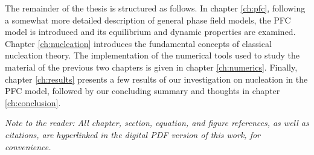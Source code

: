 The remainder of the thesis is structured as follows. In chapter \ref{ch:pfc}, following a somewhat more detailed description of general phase field models, the PFC model is introduced and its equilibrium and dynamic properties are examined. Chapter \ref{ch:nucleation} introduces the fundamental concepts of classical nucleation theory. The implementation of the numerical tools used to study the material of the previous two chapters is given in chapter \ref{ch:numerics}. Finally, chapter \ref{ch:results} presents a few results of our investigation on nucleation in the PFC model, followed by our concluding summary and thoughts in chapter \ref{ch:conclusion}.

\textit{Note to the reader: All chapter, section, equation, and figure references, as well as citations, are hyperlinked in the digital PDF version of this work, for convenience.}



